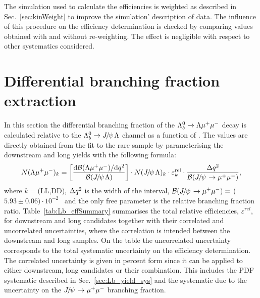 The simulation used to calculate the efficiencies is weighted as described in Sec.~\ref{sec:kinWeight} to 
improve the simulation' description of data.
The influence of this procedure on the efficiency determination is checked by comparing values obtained with
and without re-weighting. The effect is negligible with respect to other systematics considered.



\section{Differential branching fraction extraction}
\label{sec:Lb_BRsummary}

In this section the differential branching fraction of the $\Lambda^0_b\rightarrow\Lambda\mu^+\mu^-$ decay is calculated 
relative to the $\Lb\ra\jpsi\Lz$ channel as a function of \qsq.
The values are directly obtained from the fit to the rare sample by parameterising
the downstream and long yields with the following formula:
%
\begin{equation}
N(\Lz\mumu)_{k}  = \left[ \frac{\mathrm{d}\mathcal{B}(\Lz\mumu)/\mathrm{d}\qsq}{\mathcal{B}(\jpsi\Lz)} \right]  \cdot
N(\jpsi\Lz)_{k} \cdot \varepsilon^{\mathrm{rel}}_{k} \cdot \frac {\Delta\qsq} { \mathcal{B}(\jpsi\to\mumu) },
\label{eq:ield_from_BR}
\end{equation}
\noindent
where $k = $(LL,DD), $\Delta q^2$ is the width of the \qsq interval, 
\mbox{$\mathcal{B}(\jpsi\to\mumu) =$} ($5.93 \pm 0.06)\cdot 10^{-2}$~\cite{PDG2014} and the only free parameter
is the relative branching fraction ratio. Table~\ref{tab:Lb_effSummary} summarises the total relative efficiencies, 
$\varepsilon^{rel}$, for downstream and long candidates together with their correlated and uncorrelated uncertainties, 
where the correlation is intended between the downstream and long  samples. On the table the uncorrelated uncertainty 
corresponds to the total systematic uncertainty on the efficiency determination.
The correlated uncertainty is given in percent form since it can be applied to either downstream, long candidates 
or their combination. This includes the PDF systematic described in Sec.~\ref{sec:Lb_yield_sys} and the systematic 
due to the uncertainty on the $\jpsi\to\mumu$ branching fraction.

